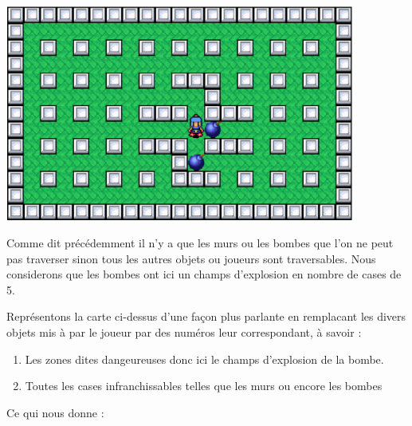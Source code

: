 			\begin{center}
				\includegraphics[width=115mm,height=71mm]{./Analyse/Img/fuite1.eps}
			\end{center}
			
			
			Comme dit précédemment il n'y a que les murs ou les bombes que l'on ne peut
			pas traverser sinon tous les autres objets ou joueurs sont traversables.
			Nous considerons que les bombes ont ici un champs d'explosion en nombre de
			cases de 5.
			
			
			Représentons la carte ci-dessus d'une façon plus parlante en remplacant les
			divers objets mis à par le joueur par des numéros leur correspondant, à
			savoir :
			
			\begin{enumerate}
			  \item Les zones dites dangeureuses donc ici le champs d'explosion de la
			  bombe.
			  \item Toutes les cases infranchissables telles que les murs ou encore les
			  bombes
			\end{enumerate}
			
			Ce qui nous donne :
			
